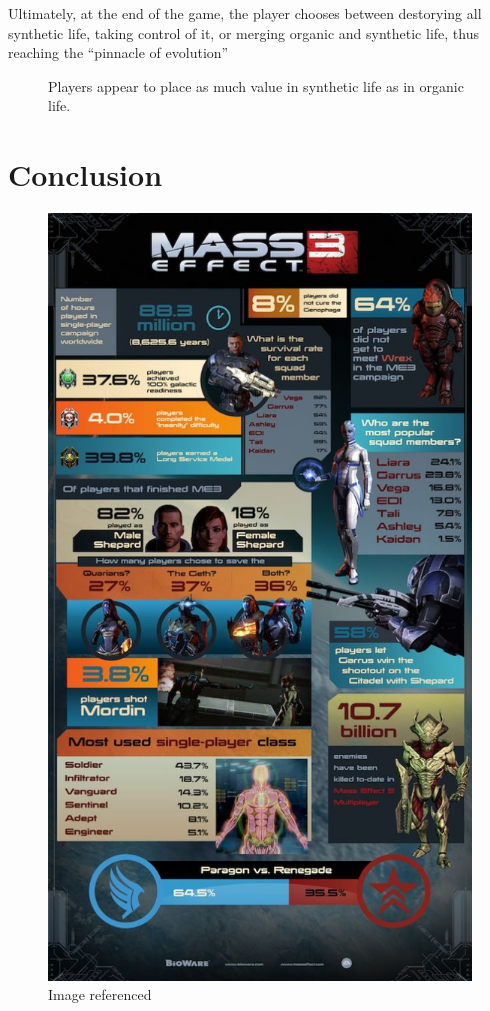 \documentclass[journal]{IEEEtran}
\begin{document}
Ultimately, at the end of the game, the player chooses between destorying
all synthetic life, taking control of it, or merging organic and synthetic life,
thus reaching the ``pinnacle of evolution''\cite{me}
\begin{figure}
 \begin{adjustbox}{width=.35\textwidth}
 \end{adjustbox}
 \caption{Players appear to place as much value in synthetic life as in organic life. \cite{ea}}
\end{figure}

\section{Conclusion}
\lipsum[7]
\nocite{*}



\begin{figure}[]
 \includegraphics[width=.45\textwidth]{stat.jpg}
 \caption{Image referenced \cite{ea}}
\end{figure}
\end{document}
